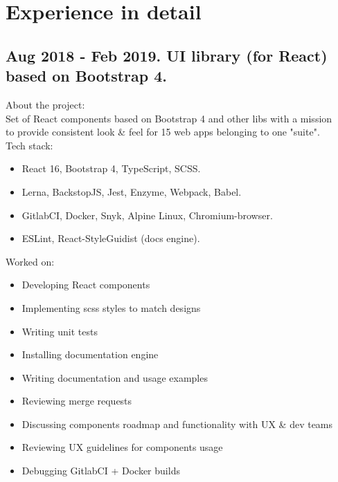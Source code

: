 \documentclass[a4paper, 14pt]{article}
\begin{document}
\section{Experience in detail}
  \subsection{Aug 2018 - Feb 2019. UI library (for React) based on Bootstrap 4.}
    About the project: \\
    Set of React components based on Bootstrap 4 and other libs with a mission \\
    to provide consistent look \& feel for 15 web apps belonging to one "suite". \\
    Tech stack:
    \begin{itemize}
      \item React 16, Bootstrap 4, TypeScript, SCSS. \\ 
      \item Lerna, BackstopJS, Jest, Enzyme, Webpack, Babel. \\
      \item GitlabCI, Docker, Snyk, Alpine Linux, Chromium-browser. \\
      \item ESLint, React-StyleGuidist (docs engine). \\
    \end{itemize}
    Worked on: 
    \begin{itemize} 
      \item Developing React components \\
      \item Implementing scss styles to match designs \\
      \item Writing unit tests \\
      \item Installing documentation engine \\
      \item Writing documentation and usage examples \\ 
      \item Reviewing merge requests \\
      \item Discussing components roadmap and functionality with UX \& dev teams  \\
      \item Reviewing UX guidelines for components usage \\
      \item Debugging GitlabCI + Docker builds \\
    \end{itemize}
\end{document}
